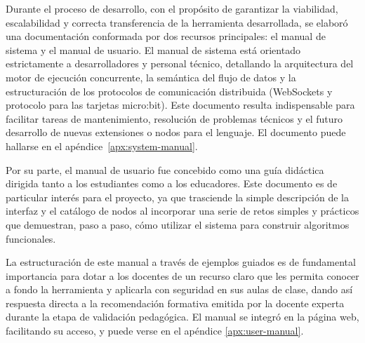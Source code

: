 
Durante el proceso de desarrollo, con el propósito de garantizar la viabilidad, escalabilidad y correcta transferencia de la herramienta desarrollada, se elaboró una documentación conformada por dos recursos principales: el manual de sistema y el manual de usuario. El manual de sistema está orientado estrictamente a desarrolladores y personal técnico, detallando la arquitectura del motor de ejecución concurrente, la semántica del flujo de datos y la estructuración de los protocolos de comunicación distribuida (WebSockets y protocolo para las tarjetas micro:bit). Este documento resulta indispensable para facilitar tareas de mantenimiento, resolución de problemas técnicos y el futuro desarrollo de nuevas extensiones o nodos para el lenguaje. El documento puede hallarse en el apéndice~\ref{apx:system-manual}.

Por su parte, el manual de usuario fue concebido como una guía didáctica dirigida tanto a los estudiantes como a los educadores. Este documento es de particular interés para el proyecto, ya que trasciende la simple descripción de la interfaz y el catálogo de nodos al incorporar una serie de retos simples y prácticos que demuestran, paso a paso, cómo utilizar el sistema para construir algoritmos funcionales.

La estructuración de este manual a través de ejemplos guiados es de fundamental importancia para dotar a los docentes de un recurso claro que les permita conocer a fondo la herramienta y aplicarla con seguridad en sus aulas de clase, dando así respuesta directa a la recomendación formativa emitida por la docente experta durante la etapa de validación pedagógica. El manual se integró en la página web, facilitando su acceso, y puede verse en el apéndice \ref{apx:user-manual}.
